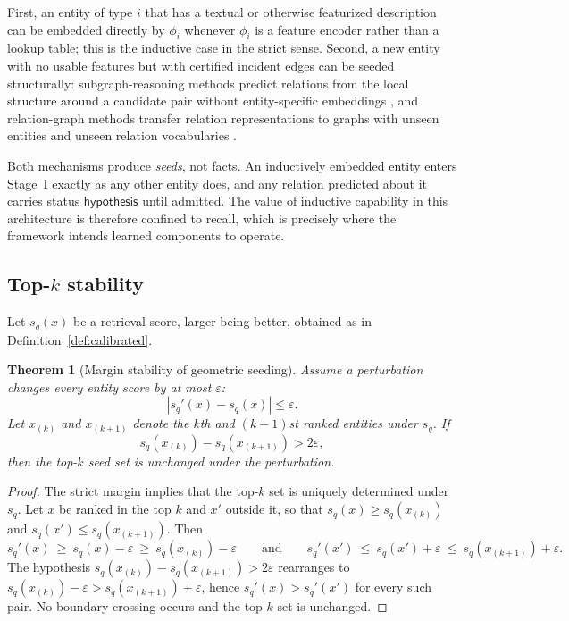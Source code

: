\documentclass[11pt]{article}
\newtheorem{theorem}[definition]{Theorem}
\begin{document}
First, an entity of type $i$ that has a textual or otherwise featurized description can be embedded directly by $\phi_i$ whenever $\phi_i$ is a feature encoder rather than a lookup table; this is the inductive case in the strict sense. Second, a new entity with no usable features but with certified incident edges can be seeded structurally: subgraph-reasoning methods predict relations from the local structure around a candidate pair without entity-specific embeddings \citep{teru2020}, and relation-graph methods transfer relation representations to graphs with unseen entities and unseen relation vocabularies \citep{lee2023}.

Both mechanisms produce \emph{seeds}, not facts. An inductively embedded entity enters Stage~I exactly as any other entity does, and any relation predicted about it carries status $\mathsf{hypothesis}$ until admitted. The value of inductive capability in this architecture is therefore confined to recall, which is precisely where the framework intends learned components to operate.

\subsection{Top-$k$ stability}
Let $s_q(x)$ be a retrieval score, larger being better, obtained as in Definition~\ref{def:calibrated}.

\begin{theorem}[Margin stability of geometric seeding]
\label{thm:margin}
Assume a perturbation changes every entity score by at most $\varepsilon$:
\[
|s_q'(x)-s_q(x)|\le \varepsilon.
\]
Let $x_{(k)}$ and $x_{(k+1)}$ denote the $k$th and $(k+1)$st ranked entities under $s_q$. If
\[
s_q(x_{(k)})-s_q(x_{(k+1)})>2\varepsilon,
\]
then the top-$k$ seed set is unchanged under the perturbation.
\end{theorem}
\begin{proof}
The strict margin implies that the top-$k$ set is uniquely determined under $s_q$. Let $x$ be ranked in the top $k$ and $x'$ outside it, so that $s_q(x)\ge s_q(x_{(k)})$ and $s_q(x')\le s_q(x_{(k+1)})$. Then
\[
s_q'(x)\ \ge\ s_q(x)-\varepsilon\ \ge\ s_q(x_{(k)})-\varepsilon
\qquad\text{and}\qquad
s_q'(x')\ \le\ s_q(x')+\varepsilon\ \le\ s_q(x_{(k+1)})+\varepsilon .
\]
The hypothesis $s_q(x_{(k)})-s_q(x_{(k+1)})>2\varepsilon$ rearranges to $s_q(x_{(k)})-\varepsilon>s_q(x_{(k+1)})+\varepsilon$, hence $s_q'(x)>s_q'(x')$ for every such pair. No boundary crossing occurs and the top-$k$ set is unchanged.
\end{proof}
\end{document}
